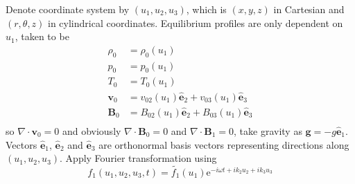 \documentclass[11pt, fleqn]{article}
\newcommand{\bv}{\boldsymbol{v}}
\newcommand{\bb}{\boldsymbol{B}}
\newcommand{\bg}{\boldsymbol{g}}
\newcommand{\ex}{\hat{\boldsymbol{e}}_1}
\newcommand{\ey}{\hat{\boldsymbol{e}}_2}
\newcommand{\ez}{\hat{\boldsymbol{e}}_3}
\begin{document}
\noindent
Denote coordinate system by $(u_1, u_2, u_3)$, which is $(x, y, z)$ in Cartesian and $(r, \theta, z)$ in cylindrical coordinates. Equilibrium profiles are only dependent on $u_1$, taken to be
\begin{equation}
	\begin{aligned}
		\rho_0	&= \rho_0(u_1)													\\
		p_0 		&= p_0(u_1)															\\
		T_0			&= T_0(u_1)															\\
		\bv_0 	&= v_{02}(u_1)\ey + v_{03}(u_1)\ez			\\
		\bb_0 	&= B_{02}(u_1)\ey + B_{03}(u_1)\ez			\\
	\end{aligned}
\end{equation}
so $\nabla \cdot \bv_0 = 0$ and obviously $\nabla \cdot \bb_0 = 0$ and $\nabla \cdot \bb_1 = 0$, take gravity as $\bg = -g\ex$. Vectors $\ex$, $\ey$ and $\ez$ are orthonormal basis vectors representing directions along $(u_1, u_2, u_3)$. Apply Fourier transformation using
\begin{equation}
	f_1(u_1, u_2, u_3, t) = \widetilde{f_1}(u_1)\text{e}^{-i\omega t + ik_2u_2 + ik_3u_3}
\end{equation}
\end{document}
